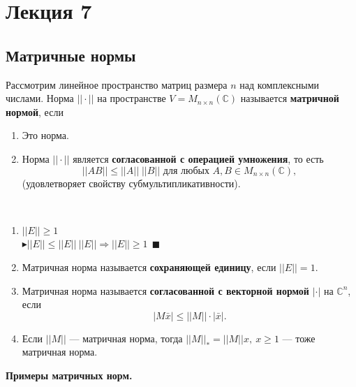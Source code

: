 \newpage
\section{Лекция 7}
\subsection{Матричные нормы}
\begin{definition}
    Рассмотрим линейное пространство матриц размера $n$ над комплексными числами. Норма $||\cdot||$ на пространстве $V=M_{n\times n}(\mathbb{C})$ называется \textbf{матричной нормой}, если \begin{enumerate}[start=0]
        \item Это норма.
        \item Норма $||\cdot ||$ является \textbf{согласованной с операцией умножения}, то есть $$||AB|| \leq ||A|| \; ||B|| \text{ для любых } A, B \in M_{n\times n}(\mathbb{C}),$$ (удовлетворяет свойству субмультипликативности).\end{enumerate}
\end{definition}
\begin{lemma}[Свойства]
    \ 
    \begin{enumerate}
        \item  $||E||\geqslant1$\\
        $\blacktriangleright ||E||\leqslant||E||~||E|| \Rightarrow ||E||\geqslant1~~\blacksquare$
        \item Матричная норма называется \textbf{сохраняющей единицу}, если $||E||=1.$
        \item Матричная норма называется \textbf{согласованной с векторной нормой} $|\cdot|$ на $\mathbb{C}^n$, если $$|M\bar x|\leqslant||M||\cdot |\bar x|.$$
        \item Если $||M||$ --- матричная норма, тогда $||M||_*=||M||x,~x\geqslant1$ --- тоже матричная норма.
    \end{enumerate}
\end{lemma}
\textbf{Примеры матричных норм.}
